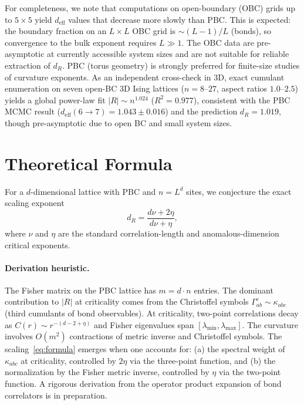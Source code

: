 \documentclass[aps,prl,twocolumn,superscriptaddress,showpacs]{revtex4-2}
\newcommand{\Scal}{R}
\newcommand{\dR}{d_{\Scal}}
\begin{document}
For completeness, we note that computations on open-boundary (OBC) grids
up to $5 \times 5$ yield $d_\mathrm{eff}$ values that decrease more slowly
than PBC. This is expected: the boundary fraction on an $L \times L$ OBC
grid is $\sim \!(L-1)/L$ (bonds), so convergence to the bulk exponent
requires $L \gg 1$. The OBC data are pre-asymptotic at currently accessible
system sizes and are not suitable for reliable extraction of $\dR$.
PBC (torus geometry) is strongly preferred for finite-size studies of
curvature exponents.
As an independent cross-check in 3D, exact cumulant enumeration on seven open-BC
3D Ising lattices ($n = 8$--$27$, aspect ratios $1.0$--$2.5$) yields a global
power-law fit $|\Scal| \sim n^{1.024}$ ($R^2 = 0.977$), consistent with the
PBC MCMC result ($d_\mathrm{eff}(6{\to}7) = 1.043 \pm 0.016$) and the prediction
$\dR = 1.019$, though pre-asymptotic due to open BC and small system sizes.


\section{Theoretical Formula}

For a $d$-dimensional lattice with PBC and $n = L^d$ sites, we conjecture the
exact scaling exponent
\begin{equation}
  \boxed{\dR = \frac{d\nu + 2\eta}{d\nu + \eta}},
  \label{eq:formula}
\end{equation}
where $\nu$ and $\eta$ are the standard correlation-length and
anomalous-dimension critical exponents.

\paragraph{Derivation heuristic.}
The Fisher matrix on the PBC lattice has $m = d \cdot n$ entries. The
dominant contribution to $|\Scal|$ at criticality comes from the
Christoffel symbols $\Gamma^c_{ab} \sim \kappa_{abc}$ (third cumulants of
bond observables). At criticality, two-point correlations decay as
$C(r) \sim r^{-(d-2+\eta)}$ and Fisher eigenvalues span $[\lambda_\mathrm{min},
\lambda_\mathrm{max}]$. The curvature involves $O(m^2)$ contractions of
metric inverse and Christoffel symbols. The scaling~\eqref{eq:formula}
emerges when one accounts for: (a) the spectral weight of $\kappa_{abc}$
at criticality, controlled by $2\eta$ via the three-point function, and
(b) the normalization by the Fisher metric inverse, controlled by $\eta$
via the two-point function. A rigorous derivation from the operator product
expansion of bond correlators is in preparation.
\end{document}
